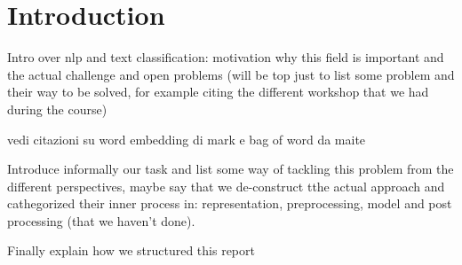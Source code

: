 \section{Introduction} \label{sec:introduction}

Intro over nlp and text classification: motivation why this field is important and the actual challenge and open problems (will be top just to list some problem and their way to be solved, for example citing the different workshop that we had during the course)

vedi citazioni su word embedding di mark e bag of word da maite

Introduce informally our task and list some way of tackling this problem from the different perspectives, maybe say that we de-construct tthe actual approach and cathegorized their inner process in: representation, preprocessing, model and post processing (that we haven't done).

Finally explain how we structured this report